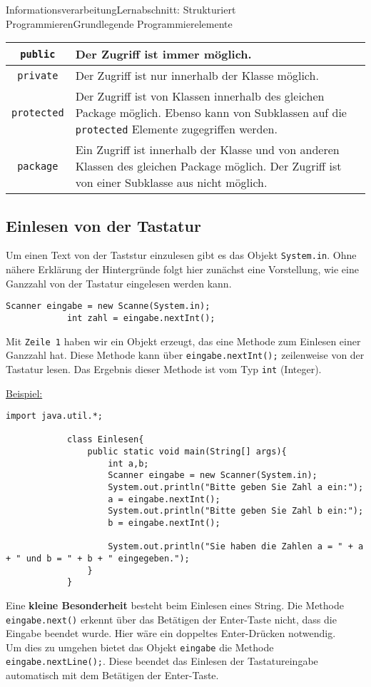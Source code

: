 \documentclass[11pt,oneside,openany,headings=optiontotoc,11pt,numbers=noenddot]{article}
\begin{document}
\begin{worksheet}{Informationsverarbeitung}{Lernabschnitt: Strukturiert Programmieren}{Grundlegende Programmierelemente}
\begin{tabularx}{\textwidth}{cX}
			\hline
			\hline
			{\lstinline[style=Python]{public}} & Der Zugriff ist immer möglich. \\
			\hline
			{\lstinline[style=Python]{private}} & Der Zugriff ist nur innerhalb der Klasse möglich.\\
			\hline
			{\lstinline[style=Python]{protected}} & Der Zugriff ist von Klassen innerhalb des gleichen Package möglich. Ebenso kann von Subklassen auf die {\lstinline[style=Python]{protected}} Elemente zugegriffen werden. \\
			\hline
			\hline
			{\lstinline[style=Python]{package}} & Ein Zugriff ist innerhalb der Klasse und von anderen Klassen des gleichen Package möglich. Der Zugriff ist von einer Subklasse aus nicht möglich.\\
			\hline
			\hline
		\end{tabularx}
		\subsection{Einlesen von der Tastatur}
		Um einen Text von der Taststur einzulesen gibt es das Objekt \lstinline[style=Python]|System.in|. Ohne nähere Erklärung der Hintergründe folgt hier zunächst eine Vorstellung, wie eine Ganzzahl von der Tastatur eingelesen werden kann.
		\begin{lstlisting}[style=Python]
			Scanner eingabe = new Scanne(System.in);
			int zahl = eingabe.nextInt();
		\end{lstlisting}
		Mit \texttt{Zeile 1} haben wir ein Objekt erzeugt, das eine Methode zum Einlesen einer Ganzzahl hat. Diese Methode kann über \lstinline[style=Python]|eingabe.nextInt();| zeilenweise von der Tastatur lesen. Das Ergebnis dieser Methode ist vom Typ \lstinline[style=Python]|int| (Integer).\\
		\par\noindent
		\underline{Beispiel:}
		\begin{lstlisting}[style=Python]
			import java.util.*;
			
			class Einlesen{
				public static void main(String[] args){
					int a,b;
					Scanner eingabe = new Scanner(System.in);
					System.out.println("Bitte geben Sie Zahl a ein:");
					a = eingabe.nextInt();
					System.out.println("Bitte geben Sie Zahl b ein:");
					b = eingabe.nextInt();
					
					System.out.println("Sie haben die Zahlen a = " + a + " und b = " + b + " eingegeben.");
				}
			}
		\end{lstlisting}
		\par\noindent
		Eine \textbf{kleine Besonderheit} besteht beim Einlesen eines String. Die Methode \lstinline[style=Python]|eingabe.next()| erkennt über das Betätigen der Enter-Taste nicht, dass die Eingabe beendet wurde. Hier wäre ein doppeltes Enter-Drücken notwendig.\\
		Um dies zu umgehen bietet das Objekt \lstinline[style=Python]|eingabe| die Methode \lstinline[style=Python]|eingabe.nextLine();|. Diese beendet das Einlesen der Tastatureingabe automatisch mit dem Betätigen der Enter-Taste.
	\end{worksheet}
\end{document}
